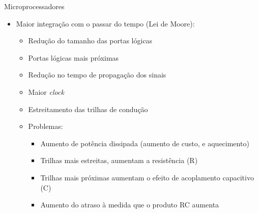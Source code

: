 \begin{slide}[toc=]{Microprocessadores}
	\begin{itemize}
		\item Maior integração com o passar do tempo (Lei de Moore):\pause
			\begin{itemize}
				\item Redução do tamanho das portas lógicas
				\item Portas lógicas mais próximas
				\item Redução no tempo de propagação dos sinais
				\item Maior \textit{clock}
				\item Estreitamento das trilhas de condução\pause
				\item Problemas:
					\begin{itemize}
						\item Aumento de potência dissipada (aumento de custo, e aquecimento)\pause
						\item Trilhas mais estreitas, aumentam a resistência (R)\pause
						\item Trilhas mais próximas aumentam o efeito de acoplamento capacitivo (C)     \pause
						\item Aumento do atraso à medida que o produto RC aumenta
					\end{itemize}
			\end{itemize}
	\end{itemize}
\end{slide}

